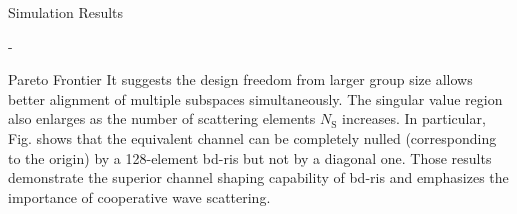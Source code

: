 \begin{section}{Simulation Results}
\begin{subsection}{-}
\begin{subsubsection}{Pareto Frontier}
			It suggests the design freedom from larger group size allows better alignment of multiple subspaces simultaneously.
			The singular value region also enlarges as the number of scattering elements $N_\mathrm{S}$ increases.
			In particular, Fig.  shows that the equivalent channel can be completely nulled (corresponding to the origin) by a 128-element \gls{bd}-\gls{ris} but not by a diagonal one.
			Those results demonstrate the superior channel shaping capability of \gls{bd}-\gls{ris} and emphasizes the importance of cooperative wave scattering.
		\end{subsubsection}


\end{subsection}
\end{section}
